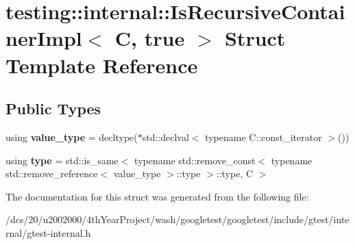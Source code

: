 \hypertarget{structtesting_1_1internal_1_1IsRecursiveContainerImpl_3_01C_00_01true_01_4}{}\section{testing\+:\+:internal\+:\+:Is\+Recursive\+Container\+Impl$<$ C, true $>$ Struct Template Reference}
\label{structtesting_1_1internal_1_1IsRecursiveContainerImpl_3_01C_00_01true_01_4}
\subsection*{Public Types}
\begin{DoxyCompactItemize}
\item 
\mbox{\label{structtesting_1_1internal_1_1IsRecursiveContainerImpl_3_01C_00_01true_01_4_a5e8e2cf58f0d2581e9e3ab5f5630cd61}} 
using {\bfseries value\+\_\+type} = decltype($\ast$std\+::declval$<$ typename C\+::const\+\_\+iterator $>$())
\item 
\mbox{\label{structtesting_1_1internal_1_1IsRecursiveContainerImpl_3_01C_00_01true_01_4_abbe7d626075829c10a83b931c625662c}} 
using {\bfseries type} = std\+::is\+\_\+same$<$ typename std\+::remove\+\_\+const$<$ typename std\+::remove\+\_\+reference$<$ value\+\_\+type $>$\+::type $>$\+::type, C $>$
\end{DoxyCompactItemize}


The documentation for this struct was generated from the following file\+:\begin{DoxyCompactItemize}
\item 
/dcs/20/u2002000/4th\+Year\+Project/wash/googletest/googletest/include/gtest/internal/gtest-\/internal.\+h\end{DoxyCompactItemize}
